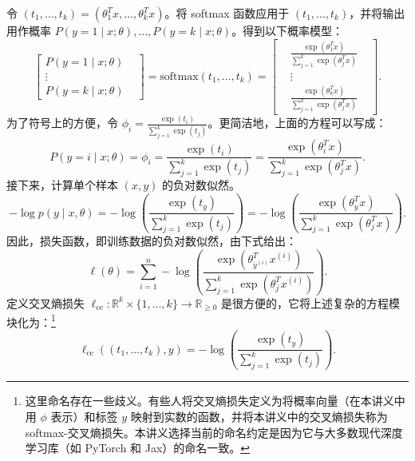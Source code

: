 令 $(t_1, \dots, t_k) = (\theta_1^T x, \dots, \theta_k^T x)$。将 softmax 函数应用于 $(t_1, \dots, t_k)$，并将输出用作概率 $P(y = 1 \mid x; \theta), \dots, P(y = k \mid x; \theta)$。得到以下概率模型：
\begin{equation}
    \begin{bmatrix} 
        P(y = 1 \mid x; \theta) \\
        \vdots& \\
        P(y = k \mid x; \theta)
    \end{bmatrix} =
    \text{softmax}(t_1, \dots, t_k) = 
    \begin{bmatrix} 
    &\frac{\exp(\theta_1^T x)}{\sum_{j=1}^k \exp(\theta_j^T x)}& \\
    &\vdots& \\
    &\frac{\exp(\theta_k^T x)}{\sum_{j=1}^k \exp(\theta_j^T x)}&
    \end{bmatrix}.
\end{equation}
为了符号上的方便，令 $\phi_i = \frac{\exp(t_i)}{\sum_{j=1}^k \exp(t_j)}$。更简洁地，上面的方程可以写成：
\begin{equation}
    P(y = i \mid x; \theta) = \phi_i = \frac{\exp(t_i)}{\sum_{j=1}^k \exp(t_j)} = \frac{\exp(\theta_i^T x)}{\sum_{j=1}^k \exp(\theta_j^T x)}.
\end{equation}
接下来，计算单个样本 $(x, y)$ 的负对数似然。
\begin{equation}
    -\log p(y \mid x, \theta) = -\log\left(\frac{\exp(t_y)}{\sum_{j=1}^k \exp(t_j)}\right) = -\log\left(\frac{\exp(\theta_y^T x)}{\sum_{j=1}^k \exp(\theta_j^T x)}\right).
\end{equation}
因此，损失函数，即训练数据的负对数似然，由下式给出：
\begin{equation}
    \ell(\theta) = \sum_{i=1}^n -\log\left(\frac{\exp(\theta_{y^{(i)}}^T x^{(i)})}{\sum_{j=1}^k \exp(\theta_j^T x^{(i)})}\right).
    \label{eq:multiclass_loss}
\end{equation}
定义交叉熵损失 $\ell_{\text{ce}}: \mathbb{R}^k \times \{1, \dots, k\} \to \mathbb{R}_{\ge 0}$ 是很方便的，它将上述复杂的方程模块化为：\footnote{这里命名存在一些歧义。有些人将交叉熵损失定义为将概率向量（在本讲义中用 $\phi$ 表示）和标签 $y$ 映射到实数的函数，并将本讲义中的交叉熵损失称为 softmax-交叉熵损失。本讲义选择当前的命名约定是因为它与大多数现代深度学习库（如 PyTorch 和 Jax）的命名一致。}
\begin{equation}
    \ell_{\text{ce}}((t_1, \dots, t_k), y) = -\log \left( \frac{\exp(t_y)}{\sum_{j=1}^k \exp(t_j)} \right).
\end{equation}

